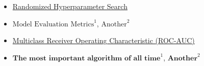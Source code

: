 \documentclass{article}
\begin{document}
\begin{itemize}
    \item \href{https://scikit-learn.org/stable/modules/generated/sklearn.model_selection.RandomizedSearchCV.html}{Randomized Hyperparameter Search}

    \item \href{https://scikit-learn.org/stable/modules/model_evaluation.html#classification-metrics}{$\text{Model Evaluation Metrics}^1$}, \href{https://www.v7labs.com/blog/f1-score-guide}{$\text{Another}^2$}
    
    \item \href{https://scikit-learn.org/stable/auto_examples/model_selection/plot_roc.html#one-vs-rest-multiclass-roc}{Multiclass Receiver Operating Characteristic (ROC-AUC)}

    \item \href{https://youtu.be/nmgFG7PUHfo?si=emVgNvaE7BQpk3al}{$\textbf{The most important algorithm of all time}^1$}, \href{https://bootcamp.uxdesign.cc/the-most-important-algorithm-of-all-time-9ff1659ff3ef}{$\textbf{Another}^2$}

\end{itemize}
\end{document}
